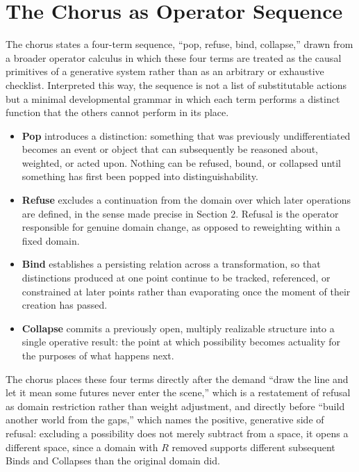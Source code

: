 \documentclass[11pt]{article}
\begin{document}
\section{The Chorus as Operator Sequence}

The chorus states a four-term sequence, ``pop, refuse, bind, collapse,'' drawn from a broader operator calculus in which these four terms are treated as the causal primitives of a generative system rather than as an arbitrary or exhaustive checklist. Interpreted this way, the sequence is not a list of substitutable actions but a minimal developmental grammar in which each term performs a distinct function that the others cannot perform in its place.

\begin{itemize}[leftmargin=1.8em]
\item \textbf{Pop} introduces a distinction: something that was previously undifferentiated becomes an event or object that can subsequently be reasoned about, weighted, or acted upon. Nothing can be refused, bound, or collapsed until something has first been popped into distinguishability.
\item \textbf{Refuse} excludes a continuation from the domain over which later operations are defined, in the sense made precise in Section 2. Refusal is the operator responsible for genuine domain change, as opposed to reweighting within a fixed domain.
\item \textbf{Bind} establishes a persisting relation across a transformation, so that distinctions produced at one point continue to be tracked, referenced, or constrained at later points rather than evaporating once the moment of their creation has passed.
\item \textbf{Collapse} commits a previously open, multiply realizable structure into a single operative result: the point at which possibility becomes actuality for the purposes of what happens next.
\end{itemize}

The chorus places these four terms directly after the demand ``draw the line and let it mean some futures never enter the scene,'' which is a restatement of refusal as domain restriction rather than weight adjustment, and directly before ``build another world from the gaps,'' which names the positive, generative side of refusal: excluding a possibility does not merely subtract from a space, it opens a different space, since a domain with $R$ removed supports different subsequent Binds and Collapses than the original domain did.
\end{document}
